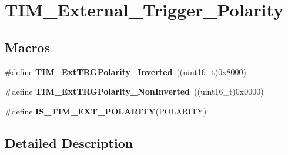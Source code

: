 \hypertarget{group___t_i_m___external___trigger___polarity}{\section{T\-I\-M\-\_\-\-External\-\_\-\-Trigger\-\_\-\-Polarity}
\label{group___t_i_m___external___trigger___polarity}
}
\subsection*{Macros}
\begin{DoxyCompactItemize}
\item 
\hypertarget{group___t_i_m___external___trigger___polarity_ga96f3959a02c0491ab8d65cfa384ce7e3}{\#define {\bfseries T\-I\-M\-\_\-\-Ext\-T\-R\-G\-Polarity\-\_\-\-Inverted}~((uint16\-\_\-t)0x8000)}\label{group___t_i_m___external___trigger___polarity_ga96f3959a02c0491ab8d65cfa384ce7e3}

\item 
\hypertarget{group___t_i_m___external___trigger___polarity_ga63fe7c58c491d2a812d5621b71c2d0c5}{\#define {\bfseries T\-I\-M\-\_\-\-Ext\-T\-R\-G\-Polarity\-\_\-\-Non\-Inverted}~((uint16\-\_\-t)0x0000)}\label{group___t_i_m___external___trigger___polarity_ga63fe7c58c491d2a812d5621b71c2d0c5}

\item 
\#define {\bfseries I\-S\-\_\-\-T\-I\-M\-\_\-\-E\-X\-T\-\_\-\-P\-O\-L\-A\-R\-I\-T\-Y}(P\-O\-L\-A\-R\-I\-T\-Y)
\end{DoxyCompactItemize}


\subsection{Detailed Description}



